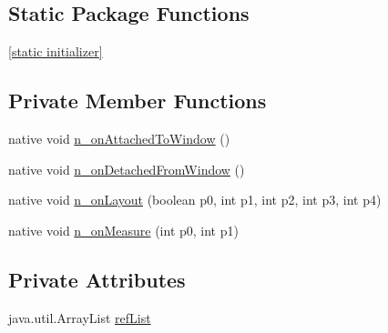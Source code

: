 \subsection*{Static Package Functions}
\begin{CompactItemize}
\item 
\hyperlink{classmd5b60ffeb829f638581ab2bb9b1a7f4f3f_1_1_carousel_page_renderer_b87f2babc1d49821ed9e8214e2e04691}{\mbox{[}static initializer\mbox{]}}
\end{CompactItemize}
\subsection*{Private Member Functions}
\begin{CompactItemize}
\item 
native void \hyperlink{classmd5b60ffeb829f638581ab2bb9b1a7f4f3f_1_1_carousel_page_renderer_67fa6f1acff5e8db91344ca99760b07f}{n\_\-onAttachedToWindow} ()
\item 
native void \hyperlink{classmd5b60ffeb829f638581ab2bb9b1a7f4f3f_1_1_carousel_page_renderer_1afc838401eaec1464487a0b2ef4b20a}{n\_\-onDetachedFromWindow} ()
\item 
native void \hyperlink{classmd5b60ffeb829f638581ab2bb9b1a7f4f3f_1_1_carousel_page_renderer_2efb0f1874a6cb3040c950ab5e63022a}{n\_\-onLayout} (boolean p0, int p1, int p2, int p3, int p4)
\item 
native void \hyperlink{classmd5b60ffeb829f638581ab2bb9b1a7f4f3f_1_1_carousel_page_renderer_8b749d1c9355603a40cba3be0b3b1c0f}{n\_\-onMeasure} (int p0, int p1)
\end{CompactItemize}
\subsection*{Private Attributes}
\begin{CompactItemize}
\item 
java.util.ArrayList \hyperlink{classmd5b60ffeb829f638581ab2bb9b1a7f4f3f_1_1_carousel_page_renderer_01f3b95caffdb860759fbe4bafdefc03}{refList}
\end{CompactItemize}


